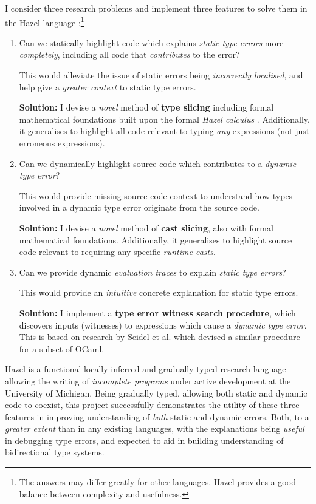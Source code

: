I consider three research problems and implement three features to solve them in the Hazel language \cite{Hazel}:\footnote{The answers may differ greatly for other languages. Hazel provides a good balance between complexity and usefulness.}
\begin{enumerate}
\item Can we statically highlight code which explains \textit{static type errors} more \textit{completely}, including all code that \textit{contributes} to the error? 

This would alleviate the issue of static errors being \textit{incorrectly localised}, and help give a \textit{greater context} to static type errors.

\textbf{Solution:} I devise a \textit{novel} method of \textbf{type slicing} including formal mathematical foundations built upon the formal \textit{Hazel calculus} \cite{HazelLivePaper}. Additionally, it generalises to highlight all code relevant to typing \textit{any} expressions (not just erroneous expressions).

\item Can we dynamically highlight source code which contributes to a \textit{dynamic type error}?

This would provide missing source code context to understand how types involved in a dynamic type error originate from the source code.

\textbf{Solution:} I devise a \textit{novel} method of \textbf{cast slicing}, also with formal mathematical foundations. Additionally, it generalises to highlight source code relevant to requiring any specific \textit{runtime casts}.

\item Can we provide dynamic \textit{evaluation traces} to explain \textit{static type errors}?

This would provide an \textit{intuitive} concrete explanation for static type errors.

\textbf{Solution:} I implement a \textbf{type error witness search procedure}, which discovers inputs (witnesses) to expressions which cause a \textit{dynamic type error}. This is based on research by Seidel et al. \cite{SearchProc} which devised a similar procedure for a subset of OCaml.
\end{enumerate}

Hazel \cite{Hazel} is a functional locally inferred and gradually typed research language allowing the writing of \textit{incomplete programs} under active development at the University of Michigan. Being gradually typed, allowing both static and dynamic code to coexist, this project successfully demonstrates the utility of these three features in improving understanding of \textit{both} static and dynamic errors. Both, to a \textit{greater extent} than in any existing languages, with the explanations being \textit{useful} in debugging type errors, and expected to aid in building understanding of bidirectional type systems.

